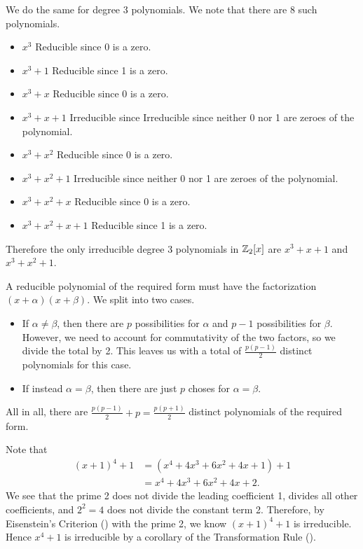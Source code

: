 \begin{questions}
\begin{partquestions}{\alph*}
        \item We do the same for degree 3 polynomials. We note that there are 8 such polynomials.
        \begin{itemize}
            \item $\boxed{x^3}$ Reducible since 0 is a zero.
            \item $\boxed{x^3 + 1}$ Reducible since 1 is a zero.
            \item $\boxed{x^3 + x}$ Reducible since 0 is a zero.
            \item $\boxed{x^3 + x + 1}$ Irreducible since Irreducible since neither 0 nor 1 are zeroes of the polynomial.
            \item $\boxed{x^3 + x^2}$ Reducible since 0 is a zero.
            \item $\boxed{x^3 + x^2 + 1}$ Irreducible since neither 0 nor 1 are zeroes of the polynomial.
            \item $\boxed{x^3 + x^2 + x}$ Reducible since 0 is a zero.
            \item $\boxed{x^3 + x^2 + x + 1}$ Reducible since 1 is a zero.
        \end{itemize}
        Therefore the only irreducible degree 3 polynomials in $\mathbb{Z}_2[x]$ are $x^3+x+1$ and $x^3+x^2+1$.
    \end{partquestions}

    \item A reducible polynomial of the required form must have the factorization $(x+\alpha)(x+\beta)$. We split into two cases.
    \begin{itemize}
        \item If $\alpha \neq \beta$, then there are $p$ possibilities for $\alpha$ and $p - 1$ possibilities for $\beta$. However, we need to account for commutativity of the two factors, so we divide the total by 2. This leaves us with a total of $\frac{p(p-1)}{2}$ distinct polynomials for this case.
        \item If instead $\alpha = \beta$, then there are just $p$ choses for $\alpha = \beta$.
    \end{itemize}
    All in all, there are $\frac{p(p-1)}{2} + p = \frac{p(p+1)}{2}$ distinct polynomials of the required form.

    \item \begin{partquestions}{\alph*}
        \item Note that
        \begin{align*}
            (x+1)^4 + 1 &= (x^4 + 4x^3 + 6x^2 + 4x + 1) + 1\\
            &= x^4 + 4x^3 + 6x^2 + 4x + 2.
        \end{align*}
        We see that the prime 2 does not divide the leading coefficient 1, divides all other coefficients, and $2^2 = 4$ does not divide the constant term 2. Therefore, by Eisenstein's Criterion () with the prime 2, we know $(x+1)^4 + 1$ is irreducible. Hence $x^4 + 1$ is irreducible by a corollary of the Transformation Rule ().


\end{partquestions}
\end{questions}
